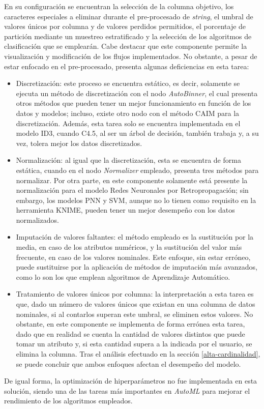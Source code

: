 En su configuración se encuentran la selección de la columna objetivo, los caracteres especiales a eliminar durante el pre-procesado de \textit{string}, el umbral de valores únicos por columna y de valores perdidos permitidos, el porcentaje de partición mediante un muestreo estratificado y la selección de los algoritmos de clasificación que se emplearán. Cabe destacar que este componente permite la visualización y modificación de los flujos implementados. No obstante, a pesar de estar enfocado en el pre-procesado, presenta algunas deficiencias en esta tarea:
\begin{itemize}
	\item Discretización: este proceso se encuentra estático, es decir, solamente se ejecuta un método de discretización con el nodo \textit{AutoBinner}, el cual presenta otros métodos que pueden tener un mejor funcionamiento en función de los datos y modelos; incluso, existe otro nodo con el método CAIM para la discretización. Además, esta tarea solo se encuentra implementada en el modelo ID3, cuando C4.5, al ser un árbol de decisión, también trabaja y, a su vez, tolera mejor los datos discretizados.
	\item Normalización: al igual que la discretización, esta se encuentra de forma estática, cuando en el nodo \textit{Normalizer} empleado, presenta tres métodos para normalizar. Por otra parte, en este componente solamente está presente la normalización para el modelo Redes Neuronales por Retropropagación; sin embargo, los modelos PNN y SVM, aunque no lo tienen como requisito en la herramienta KNIME, pueden tener un mejor desempeño con los datos normalizados.
	\item Imputación de valores faltantes: el método empleado es la sustitución por la media, en caso de los atributos numéricos, y la sustitución del valor más frecuente, en caso de los valores nominales. Este enfoque, sin estar erróneo, puede sustituirse por la aplicación de métodos de imputación más avanzados, como lo son los que emplean algoritmos de Aprendizaje Automático.
	\item Tratamiento de valores únicos por columna: la interpretación a esta tarea es que, dado un número de valores únicos que existan en una columna de datos nominales, si al contarlos superan este umbral, se eliminen estos valores. No obstante, en este componente se implementa de forma errónea esta tarea, dado que en realidad se cuenta la cantidad de valores distintos que puede tomar un atributo y, si esta cantidad supera a la indicada por el usuario, se elimina la columna. Tras el análisis efectuado en la sección \ref{alta-cardinalidad}, se puede concluir que ambos enfoques afectan el desempeño del modelo.
\end{itemize}
De igual forma, la optimización de hiperparámetros no fue implementada en esta solución, siendo una de las tareas más importantes en \textit{AutoML} para mejorar el rendimiento de los algoritmos empleados.


